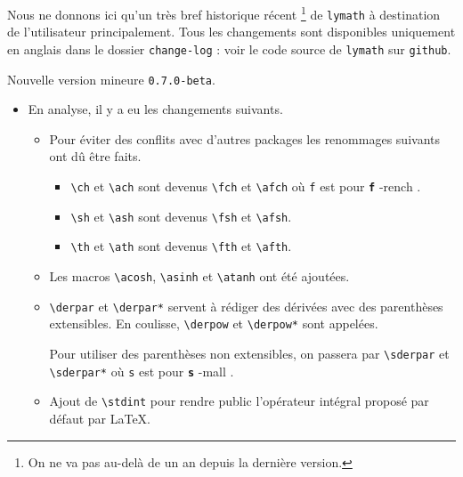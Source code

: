 \documentclass[12pt,a4paper]{article}
\newcommand\env[1]{\texttt{#1}}
\newcommand\macro[1]{\env{\textbackslash{}#1}}
\theoremstyle{definition}
\newcommand\whyprefix[2]{%
	\textbf{\prefix{#1}}-#2%
}
\newcommand\prefix[1]{%
	\texttt{#1}%
}
\begin{document}
Nous ne donnons ici qu'un très bref historique récent
\footnote{
	On ne va pas au-delà de un an depuis la dernière version.
}
de \verb+lymath+ à destination de l'utilisateur principalement.
Tous les changements sont disponibles uniquement en anglais dans le dossier \verb+change-log+ : voir le code source de \verb+lymath+ sur \verb+github+.

\begin{description}

    \medskip
    \item[2020-06-08] Nouvelle version mineure \verb+0.7.0-beta+.
    
    \begin{itemize}[itemsep=.5em]
        \item En analyse, il y a eu les changements suivants.
        \begin{itemize}[itemsep=.5em]
            \item Pour éviter des conflits avec d'autres packages les renommages suivants ont dû être faits.
            \begin{itemize}[itemsep=.5em]
                \item \macro{ch} et \macro{ach} sont devenus \macro{fch} et \macro{afch} où \prefix{f} est pour \whyprefix{f}{rench}.
    
                \item \macro{sh} et \macro{ash} sont devenus \macro{fsh} et \macro{afsh}.
    
                \item \macro{th} et \macro{ath} sont devenus \macro{fth} et \macro{afth}.
            \end{itemize}
    
    		\item Les macros \macro{acosh}, \macro{asinh} et \macro{atanh} ont été ajoutées.
    
     		\item \macro{derpar} et \macro{derpar*} servent à rédiger des dérivées avec des parenthèses extensibles. En coulisse, \macro{derpow} et \macro{derpow*} sont appelées.
    
            Pour utiliser des parenthèses non extensibles, on passera par \macro{sderpar} et \macro{sderpar*} où \prefix{s} est pour \whyprefix{s}{mall}.
    
    		\item Ajout de \macro{stdint} pour rendre public l'opérateur intégral proposé par défaut par \LaTeX.
        \end{itemize}
    

\end{itemize}
\end{description}
\end{document}
